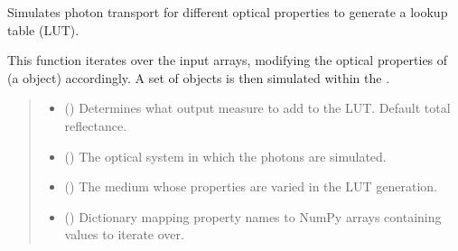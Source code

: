 \documentclass[letterpaper,10pt,english]{sphinxmanual}
\begin{document}
\begin{fulllineitems}
\label{\detokenize{generated/photon_canon.lut.lut:photon_canon.lut.lut.generate_lut}}
\pysigstartsignatures
\pysiglinewithargsret
{}
{\sphinxparamcomma {}\sphinxparamcomma {}\sphinxparamcomma {}\sphinxparamcomma {}\sphinxparamcomma {}\sphinxparamcomma {}}
{}
\pysigstopsignatures
\sphinxAtStartPar
Simulates photon transport for different optical properties to generate a lookup table (LUT).

\sphinxAtStartPar
This function iterates over the input arrays, modifying the optical properties of 
(a  object) accordingly. A set of  objects is then simulated within the .
\begin{quote}\begin{description}
\begin{itemize}
\item {} 
\sphinxAtStartPar
{} () \textendash{} Determines what output measure to add to the LUT. Default total reflectance.

\item {} 
\sphinxAtStartPar
{} ({\hyperref[\detokenize{generated/photon_canon.optics:photon_canon.optics.System}]{}}) \textendash{} The optical system in which the photons are simulated.

\item {} 
\sphinxAtStartPar
{} ({\hyperref[\detokenize{generated/photon_canon.optics:photon_canon.optics.Medium}]{}}) \textendash{} The medium whose properties are varied in the LUT generation.

\item {} 
\sphinxAtStartPar
{} (\sphinxstyleliteralemphasis{\sphinxupquote{{[}}}\sphinxstyleliteralemphasis{\sphinxupquote{, }}\sphinxstyleliteralemphasis{\sphinxupquote{{]}}}) \textendash{} Dictionary mapping property names to NumPy arrays containing values to iterate over.


\end{itemize}
\end{description}
\end{quote}
\end{fulllineitems}
\end{document}
